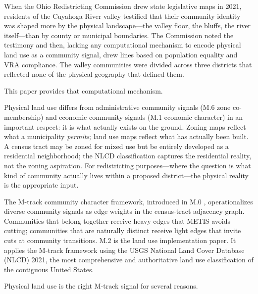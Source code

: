 \label{sec:introduction}

When the Ohio Redistricting Commission drew state legislative maps in 2021,
residents of the Cuyahoga River valley testified that their community identity
was shaped more by the physical landscape---the valley floor, the bluffs, the
river itself---than by county or municipal boundaries.
The Commission noted the testimony and then, lacking any computational mechanism
to encode physical land use as a community signal, drew lines based on population
equality and VRA compliance.
The valley communities were divided across three districts that reflected none of
the physical geography that defined them.

This paper provides that computational mechanism.

Physical land use differs from administrative community signals (M.6 zone
co-membership) and economic community signals (M.1 economic character) in an
important respect: it is what actually exists on the ground.
Zoning maps reflect what a municipality \emph{permits}; land use maps reflect
what has actually been built.
A census tract may be zoned for mixed use but be entirely developed as a
residential neighborhood; the NLCD classification captures the residential
reality, not the zoning aspiration.
For redistricting purposes---where the question is what kind of community
actually lives within a proposed district---the physical reality is the
appropriate input.

The M-track community character framework, introduced in M.0
\citep{m0framework}, operationalizes diverse community signals as edge
weights in the census-tract adjacency graph.
Communities that belong together receive heavy edges that METIS avoids
cutting; communities that are naturally distinct receive light edges that
invite cuts at community transitions.
M.2 is the land use implementation paper.
It applies the M-track framework using the USGS National Land Cover Database
(NLCD) 2021, the most comprehensive and authoritative land use classification
of the contiguous United States.

Physical land use is the right M-track signal for several reasons.

